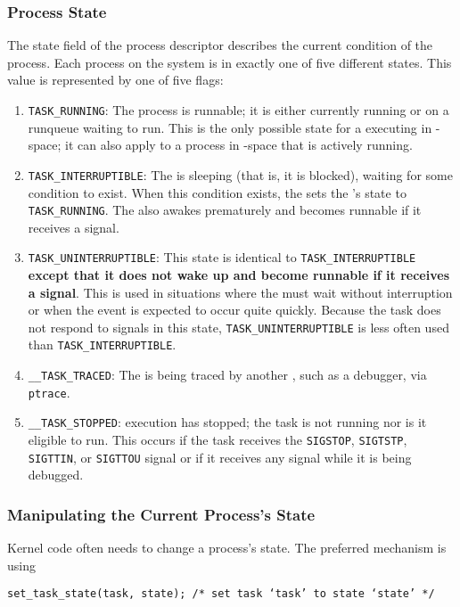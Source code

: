 \subsubsection{Process State}\label{subsubsec:Process_State}
The state field of the process descriptor describes the current condition of the process.
Each process on the system is in exactly one of five different states.
This value is represented by one of five flags:
\begin{enumerate}[noitemsep]
\item \texttt{TASK_RUNNING}: The process is runnable; it is either currently running or on a runqueue waiting to run.
  This is the only possible state for a  executing in -space; it can also apply to a process in -space that is actively running.
\item \texttt{TASK_INTERRUPTIBLE}: The  is sleeping (that is, it is blocked), waiting for some condition to exist.
  When this condition exists, the  sets the ’s state to \texttt{TASK_RUNNING}.
  The  also awakes prematurely and becomes runnable if it receives a signal.
\item \texttt{TASK_UNINTERRUPTIBLE}: This state is identical to \texttt{TASK_INTERRUPTIBLE} \textbf{except that it does not wake up and become runnable if it receives a signal}.
  This is used in situations where the  must wait without interruption or when the event is expected to occur quite quickly.
  Because the task does not respond to signals in this state, \texttt{TASK_UNINTERRUPTIBLE} is less often used than \texttt{TASK_INTERRUPTIBLE}.
\item \texttt{__TASK_TRACED}: The  is being traced by another , such as a debugger, via \texttt{ptrace}.
\item \texttt{__TASK_STOPPED}:  execution has stopped; the task is not running nor is it eligible to run.
  This occurs if the task receives the \texttt{SIGSTOP}, \texttt{SIGTSTP}, \texttt{SIGTTIN}, or \texttt{SIGTTOU} signal or if it receives any signal while it is being debugged.
\end{enumerate}

\subsubsection{Manipulating the Current Process's State}\label{subsubsec:Manipulate_Current_Process_State}
Kernel code often needs to change a process’s state.
The preferred mechanism is using
\begin{verbatim}
set_task_state(task, state); /* set task ‘task’ to state ‘state’ */
\end{verbatim}

